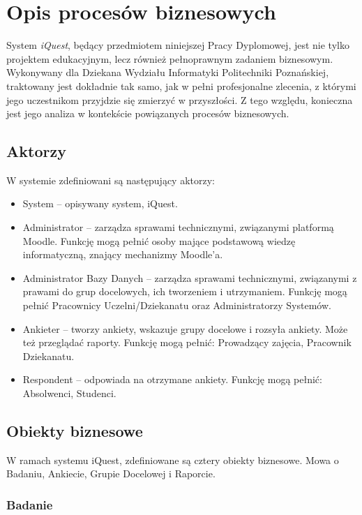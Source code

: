 \chapter{Opis procesów biznesowych}
\label{Chapter2}

System \textit{iQuest}, będący przedmiotem niniejszej Pracy Dyplomowej, jest nie tylko projektem edukacyjnym, lecz również pełnoprawnym zadaniem biznesowym. Wykonywany dla Dziekana Wydziału Informatyki Politechniki Poznańskiej, traktowany jest dokładnie tak samo, jak w pełni profesjonalne zlecenia, z którymi jego uczestnikom przyjdzie się zmierzyć w przyszłości. Z tego względu, konieczna jest jego analiza w kontekście powiązanych procesów biznesowych.

\section{Aktorzy}
\label{Chapter21}

W systemie zdefiniowani są następujący aktorzy:
\begin{itemize}
\item System -- opisywany system, iQuest.
\item Administrator -- zarządza sprawami technicznymi, związanymi platformą Moodle. Funkcję mogą pełnić osoby mające podstawową wiedzę informatyczną, znający mechanizmy Moodle'a.
\item Administrator Bazy Danych -- zarządza sprawami technicznymi, związanymi z prawami do grup docelowych, ich tworzeniem i utrzymaniem. Funkcję mogą pełnić Pracownicy Uczelni\slash Dziekanatu oraz Administratorzy Systemów.
\item Ankieter -- tworzy ankiety, wskazuje grupy docelowe i rozsyła ankiety. Może też przeglądać raporty. Funkcję mogą pełnić: Prowadzący zajęcia, Pracownik Dziekanatu.
\item Respondent -- odpowiada na otrzymane ankiety. Funkcję mogą pełnić: Absolwenci, Studenci.
\end{itemize}

\section{Obiekty biznesowe}
\label{Chapter22}

W ramach systemu iQuest, zdefiniowane są cztery obiekty biznesowe. Mowa o Badaniu, Ankiecie, Grupie Docelowej i Raporcie.

\subsection{Badanie}

